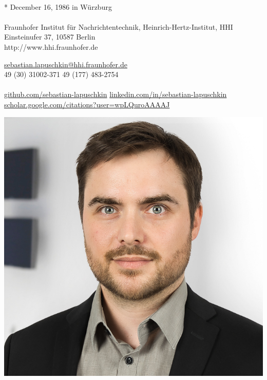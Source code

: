 \documentclass[10pt,a4paper]{article} %
\begin{document}

\noindent
\begin{minipage}{.8\textwidth}

\\
* December 16, 1986 in Würzburg  %
\\
\phantom{Contact:} \\ %
Fraunhofer Institut für Nachrichtentechnik, Heinrich-Hertz-Institut, HHI\\
Einsteinufer 37, 10587 Berlin\\
http://www.hhi.fraunhofer.de

\noindent\href{mailto:sebastian.lapuschkin@hhi.fraunhofer.de}{sebastian.lapuschkin@hhi.fraunhofer.de}\\ %
\textsmaller{+}49 (30) 31002-371\bull
\textsmaller{+}49 (177) 483-2754\\ %
\\
\href{https://github.com/sebastian-lapuschkin}{github.com/sebastian-lapuschkin}\bull %
\href{https://www.linkedin.com/in/sebastian-lapuschkin}{linkedin.com/in/sebastian-lapuschkin}%
\\
\href{https://scholar.google.com/citations?user=wpLQuroAAAAJ}{scholar.google.com/citations?user=wpLQuroAAAAJ} %
\end{minipage}
\begin{minipage}{.2\textwidth}
\includegraphics[width=\textwidth]{resources/mug-2021.jpg}
\end{minipage}
\end{document}
